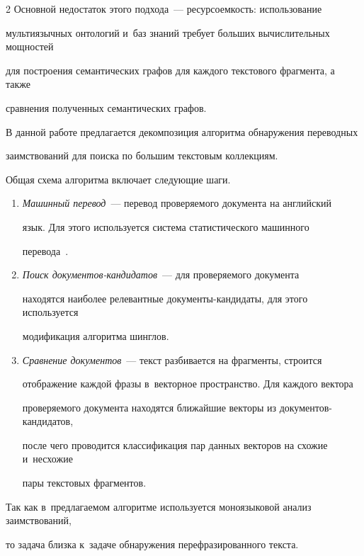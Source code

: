 \begin{multicols}{2}
Основной недостаток этого подхода~--- ресурсоемкость: использование 


мультиязычных онтологий и~баз знаний требует больших вычислительных мощностей 


для построения семантических графов для каждого текстового фрагмента, а также 


сравнения полученных семантических графов.





В данной работе предлагается декомпозиция алгоритма обнаружения переводных 


заимствований для поиска по большим текстовым коллекциям.


Общая схема алгоритма включает следующие шаги.


\begin{enumerate}


\item \textit{Машинный перевод}~--- перевод проверяемого документа на английский 


язык. Для этого используется система статистического машинного 


перевода~\cite{moses}.


\item \textit{Поиск до\-ку\-мен\-тов-кан\-ди\-да\-тов}~--- для проверяемого документа 


находятся наиболее релевантные до\-ку\-мен\-ты-кан\-ди\-да\-ты, для этого используется 


модификация алгоритма шинглов.


\item \textit{Сравнение документов}~--- текст разбивается на фрагменты, строится 


отображение каждой фразы в~векторное пространство. Для каждого вектора 


проверяемого документа находятся ближайшие векторы из до\-ку\-мен\-тов-кан\-ди\-да\-тов, 


после чего проводится классификация пар данных векторов на схожие и~несхожие 


пары текстовых фрагментов.


\end{enumerate}





Так как в~предлагаемом алгоритме используется моноязыковой анализ заимствований, 


то задача близка к~задаче обнаружения перефразированного текс\-та.



\end{multicols}
